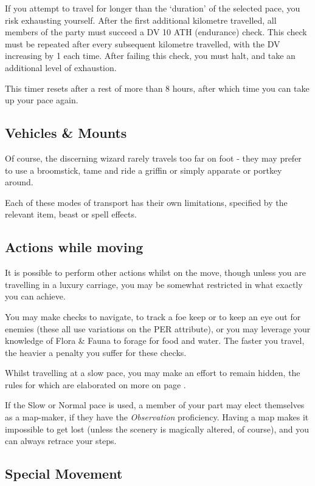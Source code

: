\normalsize
If you attempt to travel for longer than the `duration' of the selected pace, you risk exhausting yourself. After the first additional kilometre travelled, all members of the party must succeed a DV 10 ATH (endurance) check. This check must be repeated after every subsequent kilometre travelled, with the DV increasing by 1 each time. After failing this check, you must halt, and take an additional level of exhaustion. 

This timer resets after a rest of more than 8 hours, after which time you can take up your pace again. 

\subsection{Vehicles \& Mounts}

Of course, the discerning wizard rarely travels too far on foot - they may prefer to use a broomstick, tame and ride a griffin or simply apparate or portkey around. 

Each of these modes of transport has their own limitations, specified by the relevant item, beast or spell effects. 

\subsection{Actions while moving}

It is possible to perform other actions whilst on the move, though unless you are travelling in a luxury carriage, you may be somewhat restricted in what exactly you can achieve. 

You may make checks to navigate, to track a foe keep or to keep an eye out for enemies (these all use variations on the PER attribute), or you may leverage your knowledge of Flora \& Fauna to forage for food and water. The faster you travel, the heavier a penalty you suffer for these checks. 

Whilst travelling at a slow pace, you may make an effort to remain hidden, the rules for which are elaborated on more on page \pageref{S:Stealth}. 

If the Slow or Normal pace is used, a member of your part may elect themselves as a map-maker, if they have the {\it Observation} proficiency. Having a map makes it impossible to get lost (unless the scenery is magically altered, of course), and you can always retrace your steps. 

\subsection{Special Movement}\label{S:SpecialMovement}

